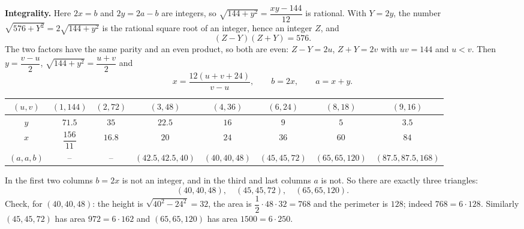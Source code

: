 \textbf{Integrality.} Here $2x=b$ and $2y=2a-b$ are integers, so $\sqrt{144+y^2}=\dfrac{xy-144}{12}$ is rational. With $Y=2y$, the number $\sqrt{576+Y^2}=2\sqrt{144+y^2}$ is the rational square root of an integer, hence an integer $Z$, and
\[(Z-Y)(Z+Y)=576 .\]
The two factors have the same parity and an even product, so both are even: $Z-Y=2u$, $Z+Y=2v$ with $uv=144$ and $u<v$. Then $y=\dfrac{v-u}{2}$, $\sqrt{144+y^2}=\dfrac{u+v}{2}$ and
\[x=\dfrac{12(u+v+24)}{v-u},\qquad b=2x,\qquad a=x+y .\]
\begin{center}
\begin{tabular}{c|ccccccc}
$(u,v)$ & $(1,144)$ & $(2,72)$ & $(3,48)$ & $(4,36)$ & $(6,24)$ & $(8,18)$ & $(9,16)$\\\hline
$y$ & $71.5$ & $35$ & $22.5$ & $16$ & $9$ & $5$ & $3.5$\\
$x$ & $\dfrac{156}{11}$ & $16.8$ & $20$ & $24$ & $36$ & $60$ & $84$\\
$(a,a,b)$ & -- & -- & $(42.5,42.5,40)$ & $(40,40,48)$ & $(45,45,72)$ & $(65,65,120)$ & $(87.5,87.5,168)$
\end{tabular}
\end{center}
In the first two columns $b=2x$ is not an integer, and in the third and last columns $a$ is not. So there are exactly three triangles:
\[\boxed{(40,40,48),\quad(45,45,72),\quad(65,65,120)}.\]
Check, for $(40,40,48)$: the height is $\sqrt{40^2-24^2}=32$, the area is $\dfrac{1}{2}\cdot48\cdot32=768$ and the perimeter is $128$; indeed $768=6\cdot128$. Similarly $(45,45,72)$ has area $972=6\cdot162$ and $(65,65,120)$ has area $1500=6\cdot250$.
